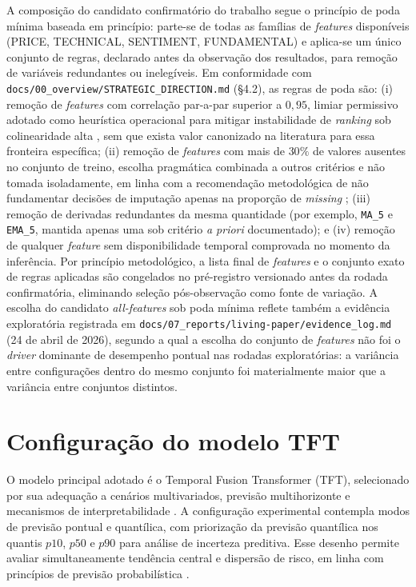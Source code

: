A composição do candidato confirmatório do trabalho segue o princípio de poda mínima baseada em princípio: parte-se de todas as famílias de \textit{features} disponíveis (PRICE, TECHNICAL, SENTIMENT, FUNDAMENTAL) e aplica-se um único conjunto de regras, declarado antes da observação dos resultados, para remoção de variáveis redundantes ou inelegíveis. Em conformidade com \texttt{docs/00\_overview/STRATEGIC\_DIRECTION.md} (§4.2), as regras de poda são: (i) remoção de \textit{features} com correlação par-a-par superior a \(0{,}95\), limiar permissivo adotado como heurística operacional para mitigar instabilidade de \textit{ranking} sob colinearidade alta \cite{TOLOSI2011}, sem que exista valor canonizado na literatura para essa fronteira específica; (ii) remoção de \textit{features} com mais de \(30\%\) de valores ausentes no conjunto de treino, escolha pragmática combinada a outros critérios e não tomada isoladamente, em linha com a recomendação metodológica de não fundamentar decisões de imputação apenas na proporção de \textit{missing} \cite{MADLEYDOWD2019}; (iii) remoção de derivadas redundantes da mesma quantidade (por exemplo, \texttt{MA\_5} e \texttt{EMA\_5}, mantida apenas uma sob critério \textit{a priori} documentado); e (iv) remoção de qualquer \textit{feature} sem disponibilidade temporal comprovada no momento da inferência. Por princípio metodológico, a lista final de \textit{features} e o conjunto exato de regras aplicadas são congelados no pré-registro versionado antes da rodada confirmatória, eliminando seleção pós-observação como fonte de variação. A escolha do candidato \textit{all-features} sob poda mínima reflete também a evidência exploratória registrada em \texttt{docs/07\_reports/living-paper/evidence\_log.md} (24 de abril de 2026), segundo a qual a escolha do conjunto de \textit{features} não foi o \textit{driver} dominante de desempenho pontual nas rodadas exploratórias: a variância entre configurações dentro do mesmo conjunto foi materialmente maior que a variância entre conjuntos distintos.

\section{Configuração do modelo TFT}
O modelo principal adotado é o Temporal Fusion Transformer (TFT), selecionado por sua adequação a cenários multivariados, previsão multihorizonte e mecanismos de interpretabilidade \cite{LIMETAL2021TFT}. A configuração experimental contempla modos de previsão pontual e quantílica, com priorização da previsão quantílica nos quantis \(p10\), \(p50\) e \(p90\) para análise de incerteza preditiva. Esse desenho permite avaliar simultaneamente tendência central e dispersão de risco, em linha com princípios de previsão probabilística \cite{GNEITING2007,KOENKERBASSETT1978}.

